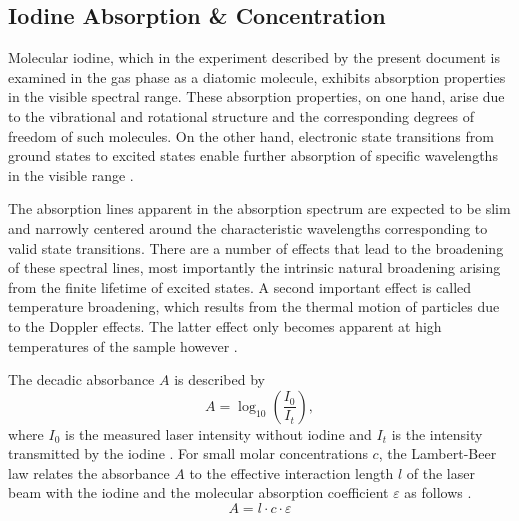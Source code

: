 \subsection{Iodine Absorption \& Concentration}

Molecular iodine, which in the experiment described by the present document is examined in the gas phase as a diatomic molecule, exhibits absorption properties in the visible spectral range. These absorption properties, on one hand, arise due to the vibrational and rotational structure and the corresponding degrees of freedom of such molecules. On the other hand, electronic state transitions from ground states to excited states enable further absorption of specific wavelengths in the visible range \cite{demtroder2014laser}.

The absorption lines apparent in the absorption spectrum are expected to be slim and narrowly centered around the characteristic wavelengths corresponding to valid state transitions. There are a number of effects that lead to the broadening of these spectral lines, most importantly the intrinsic natural broadening arising from the finite lifetime of excited states. A second important effect is called temperature broadening, which results from the thermal motion of particles due to the Doppler effects. The latter effect only becomes apparent at high temperatures of the sample however \cite{demtroder2014laser}.

The decadic absorbance $A$ is described by
\begin{equation}
    \label{eq:fundamentals:absorbance}
    A = \log_{10}\left(\frac{I_0}{I_t}\right) ,
\end{equation}
where $I_0$ is the measured laser intensity without iodine and $I_t$ is the intensity transmitted by the iodine \cite{demtroder2014laser}. For small molar concentrations $c$, the Lambert-Beer law relates the absorbance $A$ to the effective interaction length $l$ of the laser beam with the iodine and the molecular absorption coefficient $\varepsilon$ as follows \cite{attenuation}.
\begin{equation}
    \label{eq:fundamentals:beer}
    A = l \cdot c \cdot \varepsilon
\end{equation}

